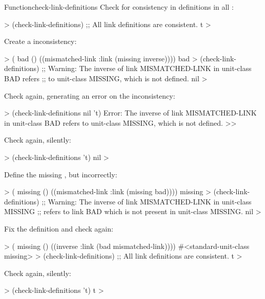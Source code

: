 \documentclass[10pt,twoside,english,pdftex]{article}
\begin{document}
\begin{functiondoc}{Function}{check-link-definitions}{
    \returns{} }
\fnexamples
Check for consistency in  definitions in all
: 
%
\W\supp
\begin{example}
  > (check-link-definitions)
  ;; All link definitions are consistent.
  t
  >
\end{example}
%
%
%
Create a  inconsistency:
%
\W\supp\notpretop
\begin{example}
  > ( bad () 
       ((mismatched-link :link (missing inverse))))
  bad
  > (check-link-definitions)
  ;; Warning: The inverse of link MISMATCHED-LINK in unit-class BAD refers
  ;;          to unit-class MISSING, which is not defined.
  nil
  >
\end{example}
%
Check again, generating an error on the inconsistency:
%
\W\supp\notpretop
\begin{example}
  > (check-link-definitions nil 't)
  Error: The inverse of link MISMATCHED-LINK in unit-class BAD refers
         to unit-class MISSING, which is not defined.
  >>\goodpagebreak
\end{example}
%
Check again, silently:
%
\W\supp\notpretop
\begin{example}
  > (check-link-definitions 't)
  nil
  >\goodpagebreak
\end{example}
%
Define the missing , but incorrectly:
%
\W\supp\notpretop
\begin{example}
  > ( missing () ((mismatched-link :link (missing bad))))
  missing
  > (check-link-definitions)
  ;; Warning: The inverse of link MISMATCHED-LINK in unit-class MISSING
  ;;          refers to link BAD which is not present in unit-class MISSING.
  nil
  >
\end{example}
%
Fix the definition and check again:
%
\W\supp\notpretop
\begin{example}
  > ( missing () ((inverse :link (bad mismatched-link))))
  #<standard-unit-class missing>
  > (check-link-definitions)
  ;; All link definitions are consistent.
  t
  >
\end{example}
%
Check again, silently:
%
\W\supp\notpretop
\begin{example}
  > (check-link-definitions 't)
  t
  > 
\end{example}

\end{functiondoc}

\end{document}

